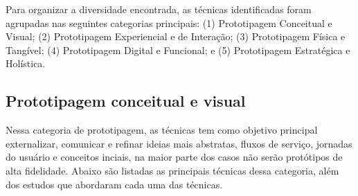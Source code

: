 Para organizar a diversidade encontrada, as técnicas identificadas foram agrupadas nas seguintes categorias principais: (1) Prototipagem Conceitual e Visual; (2) Prototipagem Experiencial e de Interação; (3) Prototipagem Física e Tangível; (4) Prototipagem Digital e Funcional; e (5) Prototipagem Estratégica e Holística.

\subsection{Prototipagem conceitual e visual}

Nessa categoria de prototipagem, as técnicas tem como objetivo principal externalizar, comunicar e refinar ideias mais abstratas, fluxos de serviço, jornadas do usuário e conceitos inciais, na maior parte dos casos não serão protótipos de alta fidelidade. Abaixo são listadas as principais técnicas dessa categoria, além dos estudos que abordaram cada uma das técnicas.

